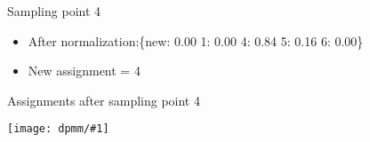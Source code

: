 \documentclass[compress]{beamer}
\newcommand{\gfx}[2]{
\begin{center}
	\texttt{[image: dpmm/\#1]}
\end{center}
}
\begin{document}
\begin{frame}{Sampling point 4}
\begin{itemize}
\begin{tiny}
\begin{align}
\only<4->{p(z_{4} = 6\,|\, \vec{z_{-4}}, \vec{x}, \alpha) & \propto \frac{1.00}{6 + 0.25} \mathcal{N} \left( \begin{array}{c} -5.00 \\ -10.00 \\ \end{array} \, \g \, \begin{array}{c} 0.50 \\ 0.50 \\ \end{array}, \mathbb{1} \right) = 0.16 \times 0.00001}
\end{align}\end{tiny}
\pause
\item<5-> After normalization:\{new: 0.00	1: 0.00	4: 0.84	5: 0.16	6: 0.00\}\pause\item<6-> New assignment = 4
\end{itemize}
\end{frame}



\begin{frame}{Assignments after sampling point 4}
    \gfx{dpmm5}{.8}
    \end{frame}
\end{document}
